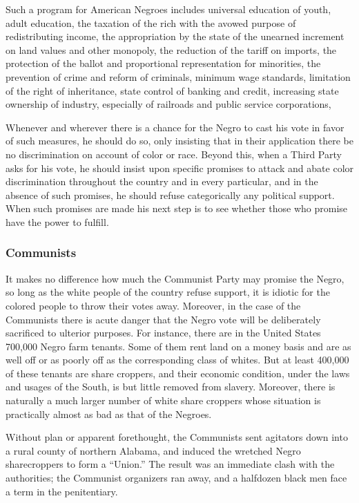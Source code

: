\documentclass[letterpaper,10pt,english]{jupyterBook}
\begin{document}
\sphinxAtStartPar
Such a program for American Negroes includes universal education of youth, adult education, the taxation of the rich with the avowed purpose of redistributing income, the appropriation by the state of the unearned increment on land values and other monopoly, the reduction of the tariff on imports, the protection of the ballot and proportional representation for minorities, the prevention of crime and reform of criminals, minimum wage standards, limitation of the right of inheritance, state control of banking and credit, increasing state ownership of industry, especially of railroads and public service corporations,

\sphinxAtStartPar
Whenever and wherever there is a chance for the Negro to cast his vote in favor of such measures, he should do so, only insisting that in their application there be no discrimination on account of color or race. Beyond this, when a Third Party asks for his vote, he should insist upon specific promises to attack and abate color discrimination throughout the country and in every particular, and in the absence of such promises, he should refuse categorically any political support. When such promises are made his next step is to see whether those who promise have the power to fulfill.


\subsubsection{Communists}
\label{\detokenize{Volumes/40/06/strategy_of_the_negro_voter:communists}}
\sphinxAtStartPar
It makes no difference how much the Communist Party may promise the Negro, so long as the white people of the country refuse support, it is idiotic for the colored people to throw their votes away. Moreover, in the case of the Communists there is acute danger that the Negro vote will be deliberately sacrificed to ulterior purposes. For instance, there are in the United States 700,000 Negro farm tenants. Some of them rent land on a money basis and are as well off or as poorly off as the corresponding class of whites. But at least 400,000 of these tenants are share croppers, and their economic condition, under the laws and usages of the South, is but little removed from slavery. Moreover, there is naturally a much larger number of white share croppers whose situation is practically almost as bad as that of the Negroes.

\sphinxAtStartPar
Without plan or apparent forethought, the Communists sent agitators down into a rural county of northern Alabama, and induced the wretched Negro sharecroppers to form a “Union.” The result was an immediate clash with the authorities; the Communist organizers ran away, and a half\sphinxhyphen{}dozen black men face a term in the penitentiary.
\end{document}
